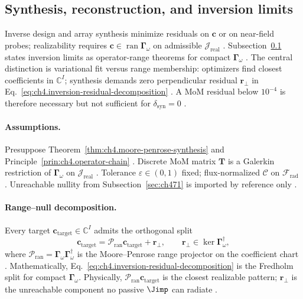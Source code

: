 ﻿\subsection{Synthesis, reconstruction, and inversion limits}
\label{sec:ch473}

Inverse design and array synthesis minimize residuals on \(\mathbf{c}\) or on near-field probes; realizability requires
\(\mathbf{c}\in\operatorname{ran}\boldsymbol{\Gamma}_\omega\) on admissible \(\mathcal{J}_{\mathrm{real}}\) \cite{stratton1941,harrington2001,devaney2004}.
Subsection~\ref{sec:ch473} states inversion limits as operator-range theorems for compact \(\boldsymbol{\Gamma}_\omega\) \cite{hansen1988}. The
central distinction is variational fit versus range membership: optimizers find closest coefficients in \(\mathbb{C}^{I}\); synthesis demands zero
perpendicular residual \(\mathbf{r}_{\perp}\) in Eq.~\eqref{eq:ch4.inversion-residual-decomposition} \cite{stratton1941,harrington2001}. A MoM
residual below \(10^{-4}\) is therefore necessary but not sufficient for \(\delta_{\mathrm{syn}}=0\) \cite{devaney2004,hansen1988}.

\paragraph{Assumptions.}
Presuppose Theorem~\ref{thm:ch4.moore-penrose-synthesis} and Principle~\ref{prin:ch4.operator-chain} \cite{harrington2001,devaney2004,stratton1941}.
Discrete MoM matrix \(\mathbf{T}\) is a Galerkin restriction of \(\boldsymbol{\Gamma}_\omega\) on \(\mathcal{J}_{\mathrm{real}}\) \cite{harrington2001}.
Tolerance \(\varepsilon\in(0,1)\) fixed; flux-normalized \(\mathcal{C}\) on \(\mathcal{F}_{\mathrm{rad}}\) \cite{hansen1988,stratton1941}. Unreachable
nullity from Subsection~\ref{sec:ch471} is imported by reference only \cite{devaney2004}.

\paragraph{Range--null decomposition.}
Every target \(\mathbf{c}_{\mathrm{target}}\in\mathbb{C}^{I}\) admits the orthogonal split
\begin{equation}
\label{eq:ch4.inversion-residual-decomposition}
\mathbf{c}_{\mathrm{target}}=\mathcal{P}_{\mathrm{ran}}\mathbf{c}_{\mathrm{target}}+\mathbf{r}_{\perp},\qquad
\mathbf{r}_{\perp}\in\ker\boldsymbol{\Gamma}_\omega^{\dagger},
\end{equation}
where \(\mathcal{P}_{\mathrm{ran}}=\boldsymbol{\Gamma}_\omega\boldsymbol{\Gamma}_\omega^{\dagger}\) is the Moore--Penrose range projector on the
coefficient chart \cite{harrington2001,stratton1941}. Mathematically, Eq.~\eqref{eq:ch4.inversion-residual-decomposition} is the Fredholm split for
compact \(\boldsymbol{\Gamma}_\omega\). Physically, \(\mathcal{P}_{\mathrm{ran}}\mathbf{c}_{\mathrm{target}}\) is the closest realizable pattern;
\(\mathbf{r}_{\perp}\) is the unreachable component no passive \(\Jimp\) can radiate \cite{devaney2004,hansen1988}.


